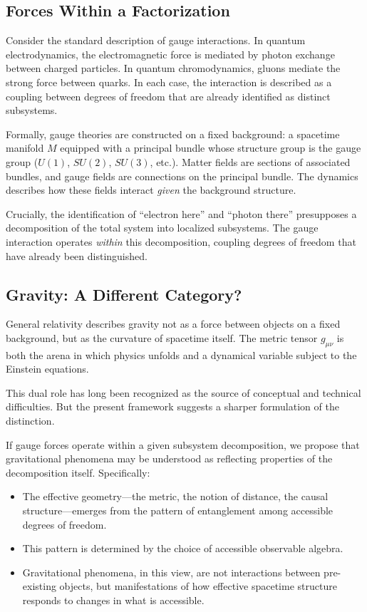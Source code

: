 \documentclass[12pt,a4paper]{article}
\begin{document}
\subsection{Forces Within a Factorization}

Consider the standard description of gauge interactions. In quantum electrodynamics, the electromagnetic force is mediated by photon exchange between charged particles. In quantum chromodynamics, gluons mediate the strong force between quarks. In each case, the interaction is described as a coupling between degrees of freedom that are already identified as distinct subsystems.

Formally, gauge theories are constructed on a fixed background: a spacetime manifold $M$ equipped with a principal bundle whose structure group is the gauge group ($U(1)$, $SU(2)$, $SU(3)$, etc.). Matter fields are sections of associated bundles, and gauge fields are connections on the principal bundle. The dynamics describes how these fields interact \emph{given} the background structure.

Crucially, the identification of ``electron here'' and ``photon there'' presupposes a decomposition of the total system into localized subsystems. The gauge interaction operates \emph{within} this decomposition, coupling degrees of freedom that have already been distinguished.

\subsection{Gravity: A Different Category?}

General relativity describes gravity not as a force between objects on a fixed background, but as the curvature of spacetime itself. The metric tensor $g_{\mu\nu}$ is both the arena in which physics unfolds and a dynamical variable subject to the Einstein equations.

This dual role has long been recognized as the source of conceptual and technical difficulties. But the present framework suggests a sharper formulation of the distinction.

If gauge forces operate within a given subsystem decomposition, we propose that gravitational phenomena may be understood as reflecting properties of the decomposition itself. Specifically:

\begin{itemize}
    \item The effective geometry—the metric, the notion of distance, the causal structure—emerges from the pattern of entanglement among accessible degrees of freedom.
    \item This pattern is determined by the choice of accessible observable algebra.
    \item Gravitational phenomena, in this view, are not interactions between pre-existing objects, but manifestations of how effective spacetime structure responds to changes in what is accessible.
\end{itemize}
\end{document}
